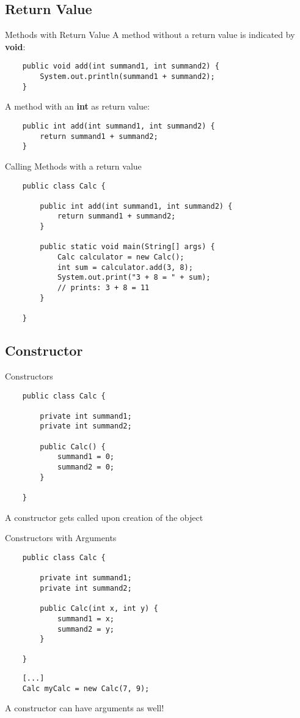 \subsection{Return Value}
\begin{frame}[fragile]{Methods with Return Value}
	A method without a return value is indicated by \textbf{void}:
	\begin{lstlisting}
	public void add(int summand1, int summand2) {
	    System.out.println(summand1 + summand2);
	}
	\end{lstlisting}
	A method with an \textbf{int} as return value:
	\begin{lstlisting}
	public int add(int summand1, int summand2) {
	    return summand1 + summand2;
	}
	\end{lstlisting}
\end{frame}

\begin{frame}[fragile]{Calling Methods with a return value}
	\begin{lstlisting}
	public class Calc {
	
	    public int add(int summand1, int summand2) {
	        return summand1 + summand2;
	    }
	    
	    public static void main(String[] args) {
	        Calc calculator = new Calc();
	        int sum = calculator.add(3, 8);
	        System.out.print("3 + 8 = " + sum); 
			// prints: 3 + 8 = 11
	    }
        
	}
	\end{lstlisting}
\end{frame}

\subsection{Constructor}

\begin{frame}[fragile]{Constructors}
	\begin{lstlisting}
	public class Calc {
    
		private int summand1;
		private int summand2;
	
	    public Calc() {
			summand1 = 0;
			summand2 = 0;
	    }
        
	}
	\end{lstlisting}
	A constructor gets called upon creation of the object
\end{frame}

\begin{frame}[fragile]{Constructors with Arguments}
	\begin{lstlisting}
	public class Calc {
    
		private int summand1;
		private int summand2;
	
	    public Calc(int x, int y) {
			summand1 = x;
			summand2 = y;
	    }
        
	}
	\end{lstlisting}
	\begin{lstlisting}
	[...]
	Calc myCalc = new Calc(7, 9);
	\end{lstlisting}
    
	A constructor can have arguments as well!
\end{frame}


